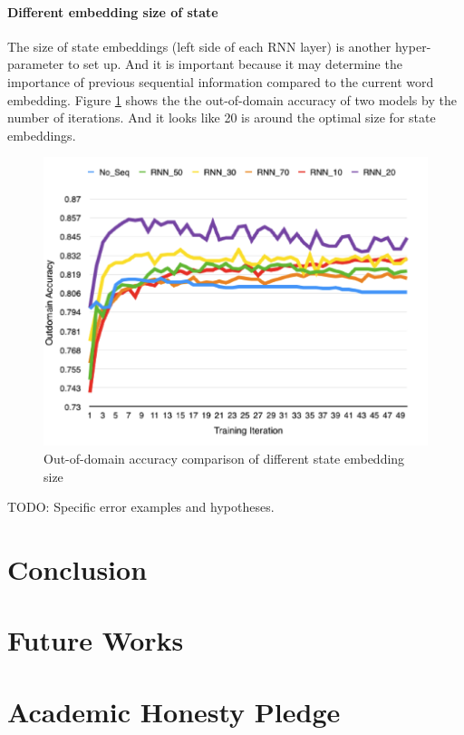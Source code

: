 \documentclass[11pt]{article}
\begin{document}
\paragraph{Different embedding size of state}
The size of state embeddings (left side of each RNN layer) is another hyper-parameter to set up. And it is important because it may determine the importance of previous sequential information compared to the current word embedding. Figure \ref{Leftsize_fig} shows the the out-of-domain accuracy of two models by the number of iterations. And it looks like 20 is around the optimal size for state embeddings.
\begin{figure}
	\includegraphics[scale=0.5]{outdomain_leftsize.png}
	\caption{Out-of-domain accuracy comparison of different state embedding size} \label{Leftsize_fig}
\end{figure}


TODO: Specific error examples and hypotheses.





\section{Conclusion}

\section{Future Works}


\section{Academic Honesty Pledge}
\end{document}
